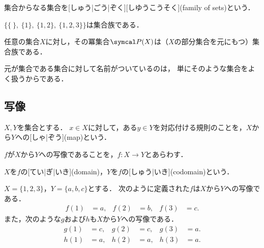 \documentclass[../sotsu.tex]{subfiles}
\begin{document}

\begin{definition}
    \label{dfn:family-of-sets}
    集合からなる集合を[しゅう|ごう|ぞく][しゆうこうそく](family of sets)という．
\end{definition}

\begin{example}
    $\bigl\{ \{ \ \}, \  \{ 1 \}, \  \{ 1, 2 \}, \  \{ 1, 2, 3 \}  \bigr\}$は集合族である．
\end{example}

\begin{example}
    任意の集合$X$に対し，その冪集合$\pset(X)$は（$X$の部分集合を元にもつ）集合族である．
\end{example}

元が集合である集合に対して名前がついているのは，
単にそのような集合をよく扱うからである．



\subsection{写像}
\label{sec:map}


\begin{definition}[写像]
    \label{dfn:map}
    $X, Y$を集合とする．
    $x \in X$に対して，ある$y \in Y$を対応付ける規則のことを，$X$から$Y$への[しゃ|ぞう](map)という．
    
    $f$が$X$から$Y$への写像であることを，$f \colon X \to Y$とあらわす．

    $X$を$f$の[てい|ぎ|いき](domain)，$Y$を$f$の[しゅう|いき](codomain)という．
\end{definition}

\begin{example}
    $X = \{ 1, 2, 3 \}$，$Y = \{ a, b, c \}$とする．
    次のように定義された$f$は$X$から$Y$への写像である．
    \begin{align*}
          f(1) &= a, 
        & f(2) &= b, 
        & f(3) &= c.
    \end{align*}
    また，次のような$g$および$h$も$X$から$Y$への写像である．
    \begin{align*}
          g(1) &= c,
        & g(2) &= c,
        & g(3) &= a.
        \\
          h(1) &= a,
        & h(2) &= a,
        & h(3) &= a.
    \end{align*}
\end{example}
\end{document}
